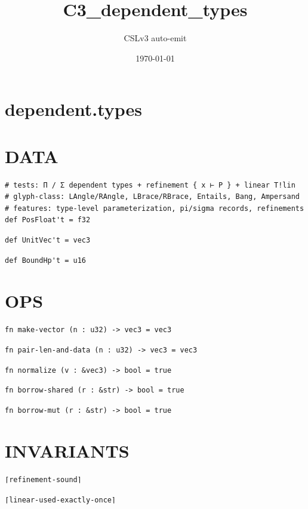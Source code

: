 \documentclass[11pt]{article}
\title{C3\_dependent\_types}
\author{CSLv3 auto-emit}
\date{\today}
\begin{document}
\maketitle
\tableofcontents

\section{dependent.types}\label{sec:dependenttypes}
\section{DATA}\label{sec:data}
\begin{lstlisting}[language=csl]
# tests: Π / Σ dependent types + refinement { x ⊢ P } + linear T!lin
# glyph-class: LAngle/RAngle, LBrace/RBrace, Entails, Bang, Ampersand
# features: type-level parameterization, pi/sigma records, refinements
def PosFloat't = f32
\end{lstlisting}
\begin{lstlisting}[language=csl]
def UnitVec't = vec3
\end{lstlisting}
\begin{lstlisting}[language=csl]
def BoundHp't = u16
\end{lstlisting}
\section{OPS}\label{sec:ops}
\begin{lstlisting}[language=csl]
fn make-vector (n : u32) -> vec3 = vec3
\end{lstlisting}
\begin{lstlisting}[language=csl]
fn pair-len-and-data (n : u32) -> vec3 = vec3
\end{lstlisting}
\begin{lstlisting}[language=csl]
fn normalize (v : &vec3) -> bool = true
\end{lstlisting}
\begin{lstlisting}[language=csl]
fn borrow-shared (r : &str) -> bool = true
\end{lstlisting}
\begin{lstlisting}[language=csl]
fn borrow-mut (r : &str) -> bool = true
\end{lstlisting}
\section{INVARIANTS}\label{sec:invariants}
\begin{lstlisting}[language=csl]
⌈refinement-sound⌉
\end{lstlisting}
\begin{lstlisting}[language=csl]
⌈linear-used-exactly-once⌉
\end{lstlisting}
\end{document}
